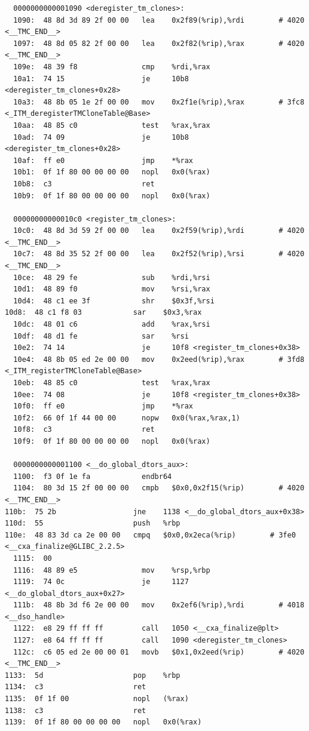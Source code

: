 \documentclass[UTF8,a4paper,10pt]{ctexart}
\begin{document}
\begin{verbatim}
  0000000000001090 <deregister_tm_clones>:
  1090:  48 8d 3d 89 2f 00 00   lea    0x2f89(%rip),%rdi        # 4020 <__TMC_END__>
  1097:  48 8d 05 82 2f 00 00   lea    0x2f82(%rip),%rax        # 4020 <__TMC_END__>
  109e:  48 39 f8               cmp    %rdi,%rax
  10a1:  74 15                  je     10b8 <deregister_tm_clones+0x28>
  10a3:  48 8b 05 1e 2f 00 00   mov    0x2f1e(%rip),%rax        # 3fc8 <_ITM_deregisterTMCloneTable@Base>
  10aa:  48 85 c0               test   %rax,%rax
  10ad:  74 09                  je     10b8 <deregister_tm_clones+0x28>
  10af:  ff e0                  jmp    *%rax
  10b1:  0f 1f 80 00 00 00 00   nopl   0x0(%rax)
  10b8:  c3                     ret
  10b9:  0f 1f 80 00 00 00 00   nopl   0x0(%rax)

  00000000000010c0 <register_tm_clones>:
  10c0:  48 8d 3d 59 2f 00 00   lea    0x2f59(%rip),%rdi        # 4020 <__TMC_END__>
  10c7:  48 8d 35 52 2f 00 00   lea    0x2f52(%rip),%rsi        # 4020 <__TMC_END__>
  10ce:  48 29 fe               sub    %rdi,%rsi
  10d1:  48 89 f0               mov    %rsi,%rax
  10d4:  48 c1 ee 3f            shr    $0x3f,%rsi
10d8:  48 c1 f8 03            sar    $0x3,%rax
  10dc:  48 01 c6               add    %rax,%rsi
  10df:  48 d1 fe               sar    %rsi
  10e2:  74 14                  je     10f8 <register_tm_clones+0x38>
  10e4:  48 8b 05 ed 2e 00 00   mov    0x2eed(%rip),%rax        # 3fd8 <_ITM_registerTMCloneTable@Base>
  10eb:  48 85 c0               test   %rax,%rax
  10ee:  74 08                  je     10f8 <register_tm_clones+0x38>
  10f0:  ff e0                  jmp    *%rax
  10f2:  66 0f 1f 44 00 00      nopw   0x0(%rax,%rax,1)
  10f8:  c3                     ret
  10f9:  0f 1f 80 00 00 00 00   nopl   0x0(%rax)

  0000000000001100 <__do_global_dtors_aux>:
  1100:  f3 0f 1e fa            endbr64
  1104:  80 3d 15 2f 00 00 00   cmpb   $0x0,0x2f15(%rip)        # 4020 <__TMC_END__>
110b:  75 2b                  jne    1138 <__do_global_dtors_aux+0x38>
110d:  55                     push   %rbp
110e:  48 83 3d ca 2e 00 00   cmpq   $0x0,0x2eca(%rip)        # 3fe0 <__cxa_finalize@GLIBC_2.2.5>
  1115:  00
  1116:  48 89 e5               mov    %rsp,%rbp
  1119:  74 0c                  je     1127 <__do_global_dtors_aux+0x27>
  111b:  48 8b 3d f6 2e 00 00   mov    0x2ef6(%rip),%rdi        # 4018 <__dso_handle>
  1122:  e8 29 ff ff ff         call   1050 <__cxa_finalize@plt>
  1127:  e8 64 ff ff ff         call   1090 <deregister_tm_clones>
  112c:  c6 05 ed 2e 00 00 01   movb   $0x1,0x2eed(%rip)        # 4020 <__TMC_END__>
1133:  5d                     pop    %rbp
1134:  c3                     ret
1135:  0f 1f 00               nopl   (%rax)
1138:  c3                     ret
1139:  0f 1f 80 00 00 00 00   nopl   0x0(%rax)


\end{verbatim}
\end{document}
